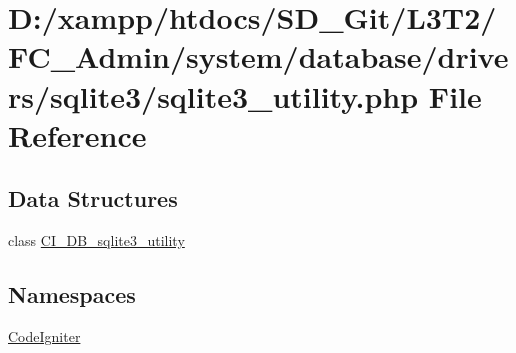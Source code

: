 \hypertarget{sqlite3__utility_8php}{}\section{D\+:/xampp/htdocs/\+S\+D\+\_\+\+Git/\+L3\+T2/\+F\+C\+\_\+\+Admin/system/database/drivers/sqlite3/sqlite3\+\_\+utility.php File Reference}
\label{sqlite3__utility_8php}
\subsection*{Data Structures}
\begin{DoxyCompactItemize}
\item 
class \hyperlink{class_c_i___d_b__sqlite3__utility}{C\+I\+\_\+\+D\+B\+\_\+sqlite3\+\_\+utility}
\end{DoxyCompactItemize}
\subsection*{Namespaces}
\begin{DoxyCompactItemize}
\item 
 \hyperlink{namespace_code_igniter}{Code\+Igniter}
\end{DoxyCompactItemize}

